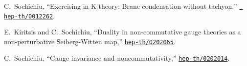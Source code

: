 \documentclass[a4paper]{article}
\begin{document}
\begin{thebibliography}{10}
C.~Sochichiu, ``Exercising in K-theory: Brane condensation without
tachyon,'' \href{http://arXiv.org/abs/hep-th/0012262}{{\tt
hep-th/0012262}}.

E.~Kiritsis and C.~Sochichiu, ``Duality in non-commutative gauge theories as a
  non-perturbative Seiberg-Witten map,''
\href{http://arXiv.org/abs/hep-th/0202065}{{\tt hep-th/0202065}}.

C.~Sochichiu, ``Gauge invariance and noncommutativity,''
\href{http://arXiv.org/abs/hep-th/0202014}{{\tt hep-th/0202014}}.

\end{thebibliography}\endgroup
\end{document}
